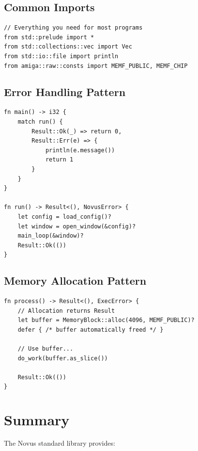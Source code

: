 \subsection{Common Imports}

\begin{lstlisting}
// Everything you need for most programs
from std::prelude import *
from std::collections::vec import Vec
from std::io::file import println
from amiga::raw::consts import MEMF_PUBLIC, MEMF_CHIP
\end{lstlisting}

\subsection{Error Handling Pattern}

\begin{lstlisting}
fn main() -> i32 {
    match run() {
        Result::Ok(_) => return 0,
        Result::Err(e) => {
            println(e.message())
            return 1
        }
    }
}

fn run() -> Result<(), NovusError> {
    let config = load_config()?
    let window = open_window(&config)?
    main_loop(&window)?
    Result::Ok(())
}
\end{lstlisting}

\subsection{Memory Allocation Pattern}

\begin{lstlisting}
fn process() -> Result<(), ExecError> {
    // Allocation returns Result
    let buffer = MemoryBlock::alloc(4096, MEMF_PUBLIC)?
    defer { /* buffer automatically freed */ }

    // Use buffer...
    do_work(buffer.as_slice())

    Result::Ok(())
}
\end{lstlisting}

\section{Summary}
\label{sec:stdlib-summary}

The Novus standard library provides:

